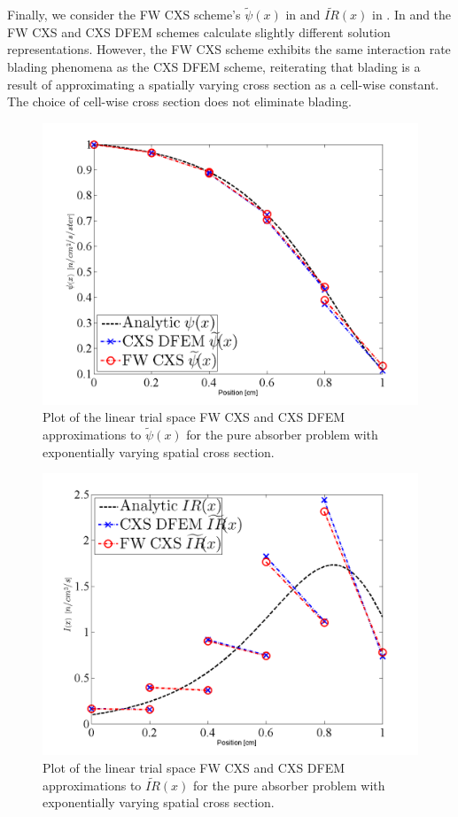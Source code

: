Finally, we consider the FW CXS scheme's $\widetilde{\psi}(x)$ in  and $\widetilde{IR}(x)$ in .  
In  and  the FW CXS and CXS DFEM schemes calculate slightly different solution representations.
However, the FW CXS scheme  exhibits the same interaction rate blading phenomena as the CXS DFEM scheme, reiterating that blading is a result of approximating a spatially varying cross section as a cell-wise constant.
The choice of cell-wise cross section does not eliminate blading.
\begin{figure}[!hbp]
\centering
\includegraphics[width=12cm]{chapter3_variable_xs/FW_Psi_Blades.png}
\caption{Plot of the linear trial space FW CXS and CXS DFEM approximations to $\widetilde{\psi}(x)$ for the pure absorber problem with exponentially varying spatial cross section.}
\label{fig:fw_blading_psi}
\end{figure}
%
%
\begin{figure}[!htp]
\centering
\includegraphics[width=12cm]{chapter3_variable_xs/FW_I_Blades.png}
\caption{Plot of the linear trial space FW CXS and CXS DFEM approximations to $\widetilde{IR}(x)$ for the pure absorber problem with exponentially varying spatial cross section.}
\label{fig:fw_blading_ir}
\end{figure}
